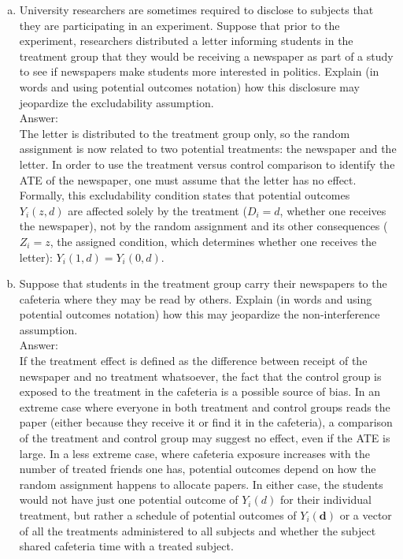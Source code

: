 \documentclass[11pt,notitlepage]{article}		%
\begin{document}
\begin{enumerate}[a)]
\item University researchers are sometimes required to disclose to subjects that they are participating in an experiment. Suppose that prior to the experiment, researchers distributed a letter informing students in the treatment group that they would be receiving a newspaper as part of a study to see if newspapers make students more interested in politics. Explain (in words and using potential outcomes notation) how this disclosure may jeopardize the excludability assumption.  \\
Answer:\\
The letter is distributed to the treatment group only, so the random assignment is now related to two potential treatments: the newspaper and the letter.  In order to use the treatment versus control comparison to identify the ATE of the newspaper, one must assume that the letter has no effect.  Formally, this excludability condition states that potential outcomes $Y_i (z,d)$ are affected solely by the treatment ($D_i=d$, whether one receives the newspaper), not by the random assignment and its other consequences ($Z_i=z$, the assigned condition, which determines whether one receives the letter): $Y_i (1,d) = Y_i (0,d)$.
\item Suppose that students in the treatment group carry their newspapers to the cafeteria where they may be read by others.  Explain (in words and using potential outcomes notation) how this may jeopardize the non-interference assumption. \\
Answer:\\
If the treatment effect is defined as the difference between receipt of the newspaper and no treatment whatsoever, the fact that the control group is exposed to the treatment in the cafeteria is a possible source of bias. In an extreme case where everyone in both treatment and control groups reads the paper (either because they receive it or find it in the cafeteria), a comparison of the treatment and control group may suggest no effect, even if the ATE is large.  In a less extreme case, where cafeteria exposure increases with the number of treated friends one has, potential outcomes depend on how the random assignment happens to allocate papers. 
In either case, the students would not have just one potential outcome of $Y_{i}(d)$ for their individual treatment, but rather a schedule of potential outcomes of $Y_{i}(\textbf{d})$ or a vector of all the treatments administered to all subjects and whether the subject shared cafeteria time with a treated subject.
\end{enumerate}
\end{document}
